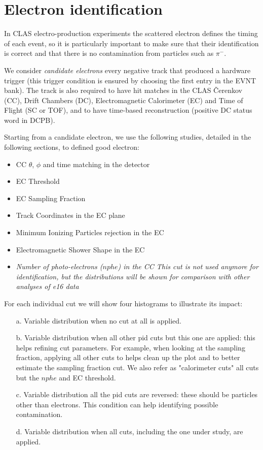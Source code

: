 \clearpage\newpage
\section{Electron identification}

In CLAS electro-production experiments
the scattered electron defines the timing of each event,
so it is particularly important to
make sure that their identification is correct and that
there is no contamination from particles such as $\pi^-$.

We consider {\it candidate electrons} every negative track
that produced a hardware trigger (this trigger condition is ensured by choosing
the first entry in the EVNT bank). The track is also required to have
hit matches in the CLAS \v Cerenkov (CC)\cite{bib:cc}, Drift Chambers (DC)\cite{bib:dc},
Electromagnetic Calorimeter (EC)\cite{bib:ec} and Time of Flight (SC or TOF)\cite{bib:ftof},
and to have time-based reconstruction (positive DC status word in DCPB).

Starting from a candidate electron, we use the following studies, detailed in the following sections,
to defined good electron:

\begin{itemize}
	\item CC $\theta$, $\phi$ and time matching in the  detector
	\item EC Threshold 
	\item EC Sampling Fraction 
	\item Track Coordinates in the EC plane 
	\item Minimum Ionizing Particles rejection in the EC
	\item Electromagnetic Shower Shape in the EC
	\item {\it Number of photo-electrons ($nphe$) in the CC
              This cut is not used anymore for identification,
              but the distributions will be shown for comparison with other analyses of e16 data }
\end{itemize}

For each individual cut we will show four histograms to illustrate its impact:

\begin{itemize}  
	\item[a.] Variable distribution when no cut at all is applied.
	\item[b.] Variable distribution when all other pid cuts but this one are applied:
	          this helps refining cut parameters.
	          For example, when looking at the sampling fraction, applying all other
	          cuts to helps clean up the plot and to better estimate the sampling fraction
	          cut. We also refer as "calorimeter cuts" all cuts but the $nphe$ and EC threshold.
	\item[c.] Variable distribution all the pid cuts are reversed: these should be particles other than electrons.
	          This condition can help identifying possible contamination.
	\item[d.] Variable distribution when all cuts, including the one under study, are applied.
\end{itemize}


